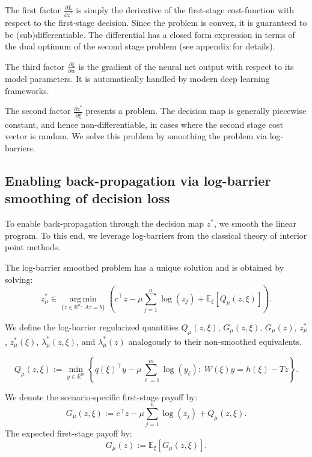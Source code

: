 \documentclass{article}
\newcommand{\R}{\mathbb{R}}
\newcommand{\E}{\mathbb{E}}
\theoremstyle{plain}
\theoremstyle{definition}
\theoremstyle{remark}
\begin{document}
The first factor $\frac{\partial L}{\partial z^*}$ is simply the derivative of the first-stage cost-function with respect to the first-stage decision. Since the problem is convex, it is guaranteed to be (sub)differentiable. The differential has a closed form expression in terms of the dual optimum of the second stage problem (see appendix for details).

The third factor $\frac{\partial \xi}{\partial w}$ is the gradient of the neural net output with respect to its model parameters. It is automatically handled by modern deep learning frameworks.

The second factor $\frac{\partial z^*}{\partial \xi}$ presents a problem. The decision map is generally piecewise constant, and hence non-differentiable, in cases where the second stage cost vector is random. We solve this problem by smoothing the problem via log-barriers.

\subsection{Enabling back-propagation via log-barrier smoothing of decision loss}
\label{sec:log-barrier}
To enable back-propagation through the decision map $z^*$, we smooth the linear program. To this end, we leverage log-barriers from the classical theory of interior point methods.

The log-barrier smoothed problem has a unique solution and is obtained by solving:
\begin{equation}
\label{eq:barrier-formulation}
z^*_\mu \in \operatorname*{arg\,min}_{\{z\in\R^n:\,Az=b\}}
\left(c^\top z-\mu\sum_{j=1}^n\log(z_j)+\E_{\xi}\!\left[Q_\mu(z,\xi)\right]\right).
\end{equation}

We define the log-barrier regularized quantities $Q_\mu(z, \xi)$, $G_\mu(z,\xi)$, $G_\mu(z)$, $z^*_\mu$, $z^*_\mu(\xi)$, $\lambda_\mu^*(z, \xi)$, and $\lambda_\mu^*(z)$ analogously to their non-smoothed equivalents.

\begin{equation}
\label{eq:barrier-recourse}
Q_\mu(z,\xi):=\min_{y\in\R^m}\left\{q(\xi)^\top y-\mu\sum_{\ell=1}^m\log(y_\ell):\;W(\xi)y=h(\xi)-Tz\right\}.
\end{equation}

We denote the scenario-specific first-stage payoff by:
\begin{equation}
\label{eq:Gmu-scenario}
G_\mu(z,\xi):=c^\top z-\mu\sum_{j=1}^n\log(z_j)+Q_\mu(z,\xi).
\end{equation}
The expected first-stage payoff by:
\begin{equation}
\label{eq:Gmu-expected}
G_\mu(z):=\E_{\xi}\!\left[G_\mu(z,\xi)\right].
\end{equation}
\end{document}
